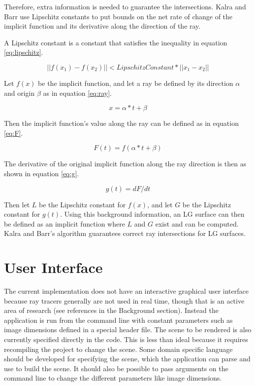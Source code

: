 \documentclass[conference]{acmsiggraph}
\begin{document}
Therefore, extra information is needed to guarantee the intersections.
Kalra and Barr use Lipschitz constants to put bounds
on the net rate of change of the implicit function and its derivative along
the direction of the ray.

A Lipschitz constant is a constant that satisfies the inequality in 
equation \ref{eq:lipschitz}.

\begin{equation}
\label{eq:lipschitz}
||f(x_1) - f(x_2)|| < LipschitzConstant * ||x_1 - x_2||
\end{equation}

Let $f(x)$ be the implicit function, and let a ray be defined by its 
direction $\alpha$ and origin $\beta$ as in equation \ref{eq:ray}.

\begin{equation}
\label{eq:ray}
x = \alpha * t + \beta
\end{equation}

Then the implicit function's value along the ray can be defined as in
equation \ref{eq:F}.

\begin{equation}
\label{eq:F}
F(t) = f(\alpha * t + \beta)
\end{equation}

The derivative of the original implicit function along the ray direction is 
then as shown in equation \ref{eq:g}.

\begin{equation}
\label{eq:g}
g(t) = dF/dt
\end{equation}

Then let $L$ be the Lipschitz constant for $f(x)$, and let $G$ be the Lipschitz
constant for $g(t)$.  Using this background information, an LG surface can
then be defined as an implicit function where $L$ and $G$ exist and can be
computed.  Kalra and Barr's algorithm guarantees correct ray intersections
for LG surfaces.

\section{User Interface}

The current implementation does not have an interactive graphical user 
interface because ray tracers generally are not used in real time,
though that is an active area of research (see references in the Background
section).  Instead the application is run from the command line with constant 
parameters such as image dimensions defined in a special header file.
The scene to be rendered is also currently specified directly in the 
code.  This is less than ideal because it requires recompiling the project to 
change the scene.  Some domain specific language should be developed
for specifying the scene, which the application can parse and
use to build the scene.  It should also be possible to pass arguments
on the command line to change the different parameters like
image dimensions.
\end{document}
